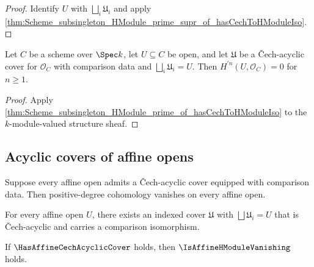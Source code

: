 \begin{proof}


\leanok
  Identify \(U\) with \(\bigsqcup_i\mathfrak U_i\) and apply \cref{thm:Scheme_subsingleton_HModule_prime_supr_of_hasCechToHModuleIso}.
\end{proof}

\begin{theorem}\leanok
  \label{thm:Scheme_subsingleton_HModule_prime_of_hasCechToHModuleIso_curve}

  Let \(C\) be a scheme over \(\Spec k\), let \(U\subseteq C\) be open, and let \(\mathfrak U\) be a \v{C}ech-acyclic cover for \(\mathcal O_C\) with comparison data and \(\bigsqcup_i\mathfrak U_i=U\). Then \(H^{\prime n}(U,\mathcal O_C)=0\) for \(n\geq1\).
\end{theorem}

\begin{proof}


\leanok
  Apply \cref{thm:Scheme_subsingleton_HModule_prime_of_hasCechToHModuleIso} to the \(k\)-module-valued structure sheaf.
\end{proof}

\subsection{Acyclic covers of affine opens}

Suppose every affine open admits a \v{C}ech-acyclic cover equipped with comparison data. Then positive-degree cohomology vanishes on every affine open.

\begin{definition}\leanok
  \label{def:Scheme_HasAffineCechAcyclicCover}

  For every affine open \(U\), there exists an indexed cover \(\mathfrak U\) with \(\bigsqcup \mathfrak U_i = U\) that is Čech-acyclic and carries a comparison isomorphism.
\end{definition}

\begin{theorem}\leanok
  \label{thm:Scheme_instIsAffineHModuleVanishing_of_hasAffineCechAcyclicCover}

  If \(\HasAffineCechAcyclicCover\) holds, then \(\IsAffineHModuleVanishing\) holds.
\end{theorem}

